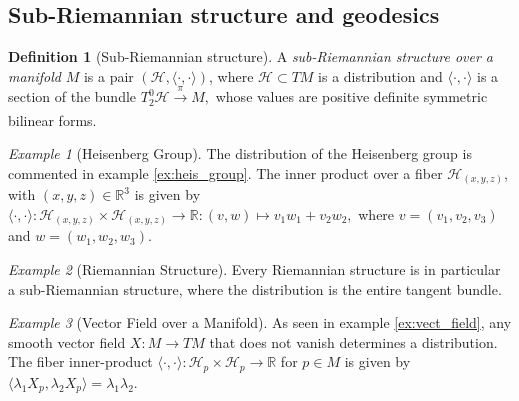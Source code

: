 \documentclass [xcolor=svgnames, t] {beamer}
\theoremstyle{definition}
\newtheorem{df}{Definition}
\theoremstyle{plain}
\theoremstyle{remark}
\newtheorem{ex}{Example}
\begin{document}
\subsection{Sub-Riemannian structure and geodesics}
\begin{frame}
	\begin{df}[Sub-Riemannian structure]
	A \textit{sub-Riemannian structure over a manifold} $ M $ is a pair $ (\mathcal{H}, \langle\cdot,\cdot\rangle)$, where $ \mathcal{H}\subset TM $ is a distribution and $ \langle\cdot,\cdot\rangle $ is a section of the bundle $ T^0_2 \mathcal{H} \xrightarrow[]{\pi} M, $ whose values are positive definite symmetric bilinear forms.
\end{df}

\begin{ex}[Heisenberg Group]\label{ex:heis_group2}
	The distribution of the Heisenberg group is commented in example \ref{ex:heis_group}. The inner product over a fiber $ \mathcal{H}_{(x,y,z)} $, with $ (x,y,z)\in \mathbb{R}^3 $  is given by $\langle\cdot,\cdot\rangle:  \mathcal{H}_{(x,y,z)}\times\mathcal{H}_{(x,y,z)} \rightarrow { \mathbb{R} }:(v,w)\mapsto v_1w_1+v_2w_2,$ where $ v=(v_1,v_2,v_3) $ and $ w=(w_1,w_2,w_3). $  

\end{ex}
\begin{ex}[Riemannian Structure]\label{ex:riem_geo2}
	Every Riemannian structure is in particular a sub-Riemannian structure, where the distribution is the entire tangent bundle.
\end{ex}
\begin{ex}[Vector Field over a Manifold]\label{ex:vect_field2}
	As seen in example \ref{ex:vect_field}, any smooth vector field $ X: M \rightarrow TM$ that does not vanish determines a distribution.  The fiber inner-product $ \langle\cdot,\cdot\rangle: \mathcal{H}_p \times \mathcal{H}_p \rightarrow \mathbb{R} $ for $ p\in M $  is given by $\langle\lambda_1 X_p,\lambda_2 X_p\rangle=\lambda_1 \lambda_2.$
\end{ex}


\end{frame}
\end{document}
